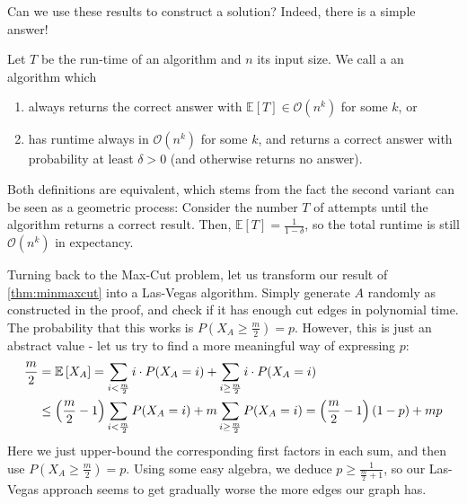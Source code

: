 Can we use these results to construct a solution?
Indeed, there is a simple answer!
\begin{definition}
    Let $T$ be the run-time of an algorithm and $n$ its input size.
    We call a  an algorithm which
    \begin{enumerate}
        \item always returns the correct answer
              with $\mathbb{E}[T] \in \mathcal{O}(n^k)$ for some $k$, or
        \item has runtime always in $\mathcal{O}(n^k)$ for some $k$, and returns a correct answer with probability at least $\delta > 0$
              (and otherwise returns no answer).
    \end{enumerate}
\end{definition}
\begin{remark}
    Both definitions are equivalent, which stems from the fact the second variant can be seen as a geometric process:
    Consider the number $T$ of attempts until the algorithm returns a correct result.
    Then, $\mathbb{E}[T] = \frac{1}{1-\delta}$, so the total runtime is still $\mathcal{O}(n^k)$ in expectancy.
\end{remark}
Turning back to the Max-Cut problem, let us transform our result of \autoref{thm:minmaxcut} into a Las-Vegas algorithm.
Simply generate $A$ randomly as constructed in the proof, and check if it has enough cut edges in polynomial time.
The probability that this works is $P(X_A \geq \frac{m}{2}) = p$.
However, this is just an abstract value - let us try to find a more meaningful way of expressing $p$:
\begin{align}
    \frac{m}{2} &= \mathbb{E}\left[X_A\right] =  \sum_{i < \frac{m}{2}}i \cdot P(X_A = i) + \sum_{i \geq \frac{m}{2}}i \cdot P(X_A = i) \\
    &\leq \left(\frac{m}{2} - 1\right)\sum_{i < \frac{m}{2}} P(X_A = i) + m \sum_{i \geq \frac{m}{2}} P(X_A = i) = \left(\frac{m}{2} - 1\right)(1 - p) + mp
\end{align}
Here we just upper-bound the corresponding first factors in each sum, and then use $P(X_A \geq \frac{m}{2}) = p$.
Using some easy algebra, we deduce $p \geq \frac{1}{\frac{m}{2} + 1}$, so our Las-Vegas approach seems to get gradually worse the more edges our graph has.

